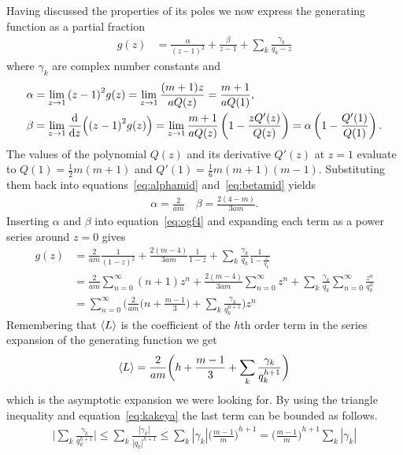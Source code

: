 Having discussed the properties of its poles we now express the generating function as a partial fraction
\begin{align}
	g(z) &=
		\frac{\alpha}{{(z-1)}^2} + \frac{\beta}{z-1}
		+ \sum_k \frac{\gamma_k}{q_k-z}
	\label{eq:ogf4}
\end{align}
where $\gamma_k$ are complex number constants and
\begin{align}
	\alpha
		&= \lim\limits_{z \rightarrow 1}{(z-1)}^2 g(z)
		 = \lim\limits_{z \rightarrow 1} \frac{(m+1)z}{aQ(z)}
		 = \frac{m+1}{aQ(1)},\label{eq:alphamid}\\
	\beta
		&= \lim\limits_{z \rightarrow 1}\frac{\mathrm{d}}{\mathrm{d} z}\Big({(z-1)}^2 g(z)\Big)
		 = \lim\limits_{z \rightarrow 1} \frac{m+1}{aQ(z)}\left(1 - \frac{zQ'(z)}{Q(z)}\right)
		 = \alpha\left(1 - \frac{Q'(1)}{Q(1)}\right)\label{eq:betamid}.
\end{align}
The values of the polynomial $Q(z)$ and its derivative $Q'(z)$ at $z=1$ evaluate to $Q(1) = \frac{1}{2}m(m+1)$ and $Q'(1) = \frac{1}{6}m(m+1)(m-1)$. Substituting them back into equations~\ref{eq:alphamid} and~\ref{eq:betamid} yields
\begin{align}
	\alpha = \frac{2}{am} \quad
	\beta = \frac{2(4-m)}{3am}.
\end{align}
Inserting $\alpha$ and $\beta$ into equation~\ref{eq:ogf4} and expanding each term as a power series around $z=0$ gives
\begin{align*}
	g(z)
		\nonumber&= \frac{2}{am}\frac{1}{{(1-z)}^2} + \frac{2(m-4)}{3am}\frac{1}{1-z} + \sum_k\frac{\gamma_k}{q_k}\frac{1}{1-\frac{z}{q_k}}\\
		\nonumber&= \frac{2}{am}\sum_{n=0}^\infty (n+1) z^n + \frac{2(m-4)}{3am}\sum_{n=0}^\infty z^n + \sum_k \frac{\gamma_k}{q_k}\sum_{n=0}^\infty \frac{z^n}{q_k^n}\\
		&= \sum_{n=0}^\infty \bigg(\frac{2}{am}\Big(n + \frac{m - 1}{3}\Big) + \sum_k \frac{\gamma_k}{q_k^{n+1}}\bigg) z^n
\end{align*}
Remembering that $\left\langle L \right\rangle$ is the coefficient of the $h$th order term in the series expansion of the generating function we get
\begin{align}
	\left\langle L \right\rangle\label{eq:asymptotic1}
		= \frac{2}{am}\bigg(h + \frac{m-1}{3} + \sum_k \frac{\gamma_k}{q_k^{h+1}}\bigg)
\end{align}
which is the asymptotic expansion we were looking for. By using the triangle inequality and equation~\ref{eq:kakeya} the last term can be bounded as follows.
\begin{align}
	\bigg|\sum_k \frac{\gamma_k}{q_k^{h+1}}\bigg|
	\leq \sum_k \frac{|\gamma_k|}{|q_k|^{h+1}}
	\leq \sum_k |\gamma_k|{\Big(\frac{m-1}{m}\Big)}^{h+1}
	= {\Big(\frac{m-1}{m}\Big)}^{h+1}\sum_k |\gamma_k|
\end{align}
